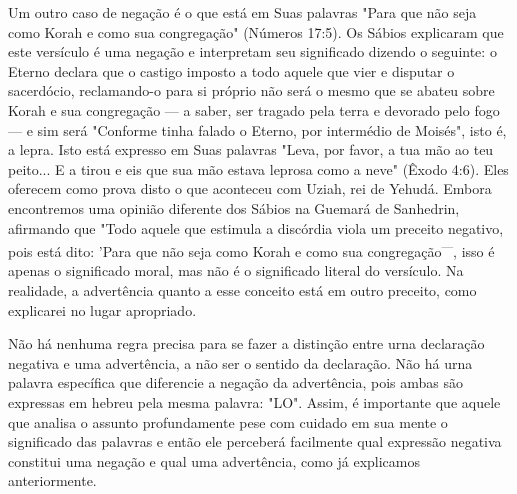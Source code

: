 \begin{itemize}
\begin{enumrate}
Um outro caso de negação é o que está em Suas palavras "Para que não
seja como Korah e como sua congregação" (Números 17:5). Os Sábios
ex­plicaram que este versículo é uma negação e interpretam seu
significado dizen­do o seguinte: o Eterno declara que o castigo imposto
a todo aquele que vier e disputar o sacerdócio, reclamando-o para si
próprio não será o mesmo que se abateu sobre Korah e sua congregação ---
a saber, ser tragado pela terra e devorado pelo fogo --- e sim será
"Conforme tinha falado o Eterno, por inter­médio de Moisés", isto é, a
lepra. Isto está expresso em Suas palavras "Leva, por favor, a tua mão
ao teu peito... E a tirou e eis que sua mão estava leprosa como a neve"
(Êxodo 4:6). Eles oferecem como prova disto o que aconteceu com Uziah,
rei de Yehudá. Embora encontremos uma opinião diferente dos Sá­bios na
Guemará de Sanhedrin, afirmando que "Todo aquele que estimula a
discórdia viola um preceito negativo, pois está dito: 'Para que não seja
como Korah e como sua congregação\textsuperscript{---}, isso é apenas o
significado moral, mas não é o significado literal do versículo. Na
realidade, a advertência quanto a esse conceito está em outro preceito,
como explicarei no lugar apropriado.

Não há nenhuma regra precisa para se fazer a distinção entre urna
declaração negativa e uma advertência, a não ser o sentido da
declaração. Não há urna palavra específica que diferencie a negação da
advertência, pois ambas são expressas em hebreu pela mesma palavra:
"LO". Assim, é importante que aquele que analisa o assunto profundamente
pese com cuidado em sua mente o significado das palavras e então ele
perceberá facilmente qual expressão ne­gativa constitui uma negação e
qual uma advertência, como já explicamos anteriormente.


\end{enumrate}
\end{itemize}
